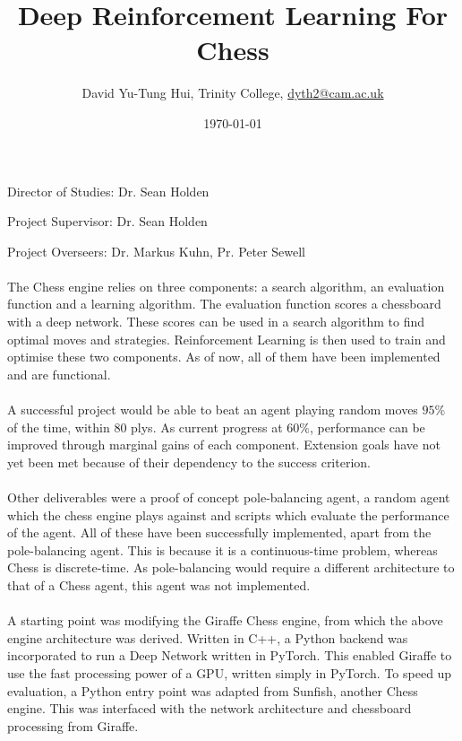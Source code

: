 \documentclass[a4paper]{article}
\title{Deep Reinforcement Learning For Chess}
\author{David Yu-Tung Hui, Trinity College, \url{dyth2@cam.ac.uk}}
\date{\today}
\begin{document}
\maketitle

\centerline{\large Director of Studies: Dr. Sean Holden}
\vspace{0.05in}
\centerline{\large Project Supervisor: Dr. Sean Holden}
\vspace{0.05in}
\centerline{\large Project Overseers: Dr. Markus Kuhn, Pr. Peter Sewell}

\paragraph{} The Chess engine relies on three components: a search algorithm, an evaluation function and a learning algorithm. The evaluation function scores a chessboard with a deep network. These scores can be used in a search algorithm to find optimal moves and strategies. Reinforcement Learning is then used to train and optimise these two components. As of now, all of them have been implemented and are functional.

\paragraph{} A successful project would be able to beat an agent playing random moves $95 \%$ of the time, within 80 plys. As current progress at $60 \%$, performance can be improved through marginal gains of each component. Extension goals have not yet been met because of their dependency to the success criterion. 

\paragraph{} Other deliverables were a proof of concept pole-balancing agent, a random agent which the chess engine plays against and scripts which evaluate the performance of the agent. All of these have been successfully implemented, apart from the pole-balancing agent. This is because it is a continuous-time problem, whereas Chess is discrete-time. As pole-balancing would require a different architecture to that of a Chess agent, this agent was not implemented.

\paragraph{} A starting point was modifying the Giraffe Chess engine, from which the above engine architecture was derived. Written in C++, a Python backend was incorporated to run a Deep Network written in PyTorch. This enabled Giraffe to use the fast processing power of a GPU, written simply in PyTorch. To speed up evaluation, a Python entry point was adapted from Sunfish, another Chess engine. This was interfaced with the network architecture and chessboard processing from Giraffe.
\end{document}
